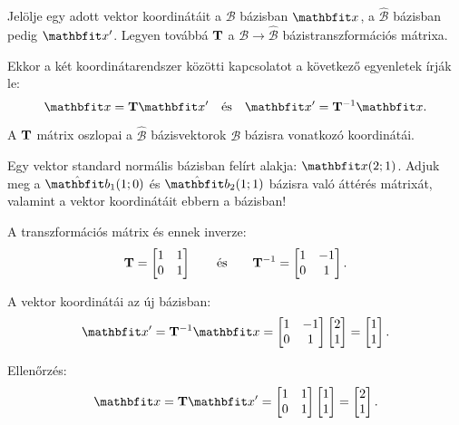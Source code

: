 \documentclass{szb-practice}
\begin{document}
\begin{note}
  Jelölje egy adott vektor koordinátáit a $\mathcal B$ bázisban $\rvec x$, a
  $\hat{\mathcal B}$ bázisban pedig $\rvec x'$. Legyen továbbá $\mathbf{T}$ a
  $\mathcal B \rightarrow \hat{\mathcal B}$ bázistranszformációs mátrixa.

  Ekkor a két koordinátarendszer közötti kapcsolatot a következő egyenletek
  írják le:
  $$
    \rvec x = \rmat T \rvec x'
    \quad\text{és}\quad
    \rvec x' = \rmat T^{-1} \rvec x
    \text.
  $$

  A $\mathbf{T}$ mátrix oszlopai a $\hat{\mathcal B}$ bázisvektorok
  $\mathcal B$ bázisra vonatkozó koordinátái.
\end{note}

\begin{example}
  Egy vektor standard normális bázisban felírt alakja: $\rvec x(2; 1)$. Adjuk
  meg a $\hat{\rvec b}_1(1; 0)$ és $\hat{\rvec b}_2(1; 1)$ bázisra való áttérés
  mátrixát, valamint a vektor koordinátáit ebbern a bázisban!

  A transzformációs mátrix és ennek inverze:
  $$
    \mathbf{T} = \begin{bmatrix}
      1 & 1 \\
      0 & 1
    \end{bmatrix}
    \qquad \text{és} \qquad
    \mathbf{T}^{-1} = \begin{bmatrix}
      1 & -1 \\
      0 & 1
    \end{bmatrix}
    \text.
  $$

  A vektor koordinátái az új bázisban:
  $$
    \rvec x' = \rmat T^{-1} \rvec x = \begin{bmatrix}
      1 & -1 \\
      0 & 1
    \end{bmatrix} \begin{bmatrix}
      2 \\ 1
    \end{bmatrix} = \begin{bmatrix}
      1 \\ 1
    \end{bmatrix}
    \text.
  $$

  Ellenőrzés:
  $$
    \rvec x = \rmat T \rvec x' = \begin{bmatrix}
      1 & 1 \\
      0 & 1
    \end{bmatrix} \begin{bmatrix}
      1 \\ 1
    \end{bmatrix} = \begin{bmatrix}
      2 \\ 1
    \end{bmatrix}
    \text.
  $$
\end{example}
\end{document}
